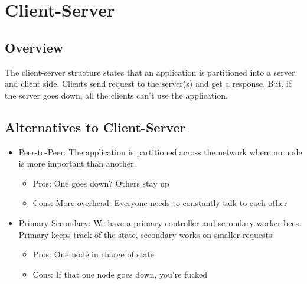 \documentclass[13pt]{article}
\begin{document}

\section{Client-Server}
\subsection{Overview}
The client-server structure states that an application is partitioned into a server and client side. Clients send request to the server(s) and get a response. But, if the server goes down, all the clients can't use the application. 

\subsection{Alternatives to Client-Server}
\begin{itemize}[leftmargin = 0pt]
\item [] Peer-to-Peer: The application is partitioned across the network where no node is more important than another.
  \begin{itemize}[leftmargin = 0pt]
  \item [] Pros: One goes down? Others stay up
  \item [] Cons: More overhead: Everyone needs to constantly talk to each other
  \end{itemize}
\item [] Primary-Secondary: We have a primary controller and secondary worker bees. Primary keeps track of the state, secondary works on smaller requests
  \begin{itemize}[leftmargin = 0pt]
  \item [] Pros: One node in charge of state
  \item [] Cons: If that one node goes down, you're fucked
  \end{itemize}
\end{itemize}
\end{document}
